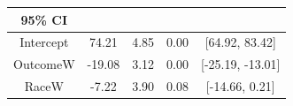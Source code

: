 \documentclass[12pt,twoside]{reedthesis}
\begin{document}
\begin{longtable}[]{@{}ccccc@{}}
\begin{minipage}[b]{0.17\columnwidth}
95\% CI\strut
\end{minipage}\tabularnewline
\midrule
\endhead
\begin{minipage}[t]{0.25\columnwidth}\centering\strut
Intercept\strut
\end{minipage} & \begin{minipage}[t]{0.15\columnwidth}\centering\strut
74.21\strut
\end{minipage} & \begin{minipage}[t]{0.15\columnwidth}\centering\strut
4.85\strut
\end{minipage} & \begin{minipage}[t]{0.15\columnwidth}\centering\strut
0.00\strut
\end{minipage} & \begin{minipage}[t]{0.17\columnwidth}\centering\strut
{[}64.92, 83.42{]}\strut
\end{minipage}\tabularnewline
\begin{minipage}[t]{0.25\columnwidth}\centering\strut
OutcomeW\strut
\end{minipage} & \begin{minipage}[t]{0.15\columnwidth}\centering\strut
-19.08\strut
\end{minipage} & \begin{minipage}[t]{0.15\columnwidth}\centering\strut
3.12\strut
\end{minipage} & \begin{minipage}[t]{0.15\columnwidth}\centering\strut
0.00\strut
\end{minipage} & \begin{minipage}[t]{0.17\columnwidth}\centering\strut
{[}-25.19, -13.01{]}\strut
\end{minipage}\tabularnewline
\begin{minipage}[t]{0.25\columnwidth}\centering\strut
RaceW\strut
\end{minipage} & \begin{minipage}[t]{0.15\columnwidth}\centering\strut
-7.22\strut
\end{minipage} & \begin{minipage}[t]{0.15\columnwidth}\centering\strut
3.90\strut
\end{minipage} & \begin{minipage}[t]{0.15\columnwidth}\centering\strut
0.08\strut
\end{minipage} & \begin{minipage}[t]{0.17\columnwidth}\centering\strut
{[}-14.66, 0.21{]}\strut
\end{minipage}\tabularnewline

\end{longtable}
\end{document}
